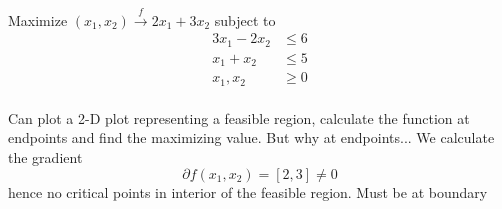 \documentclass[11pt]{article}
\begin{document}
\begin{example}
    Maximize $(x_1, x_2) \xrightarrow{f} 2x_1 + 3x_2$ subject to 
    \begin{align*}
        3x_1 - 2x_2 &\leq 6\\
        x_1 + x_2 &\leq 5\\
        x_1, x_2 &\geq 0\\
    \end{align*}
    \begin{solution}
        Can plot a 2-D plot representing a feasible region, calculate the function at endpoints and find the maximizing value. But why at endpoints... We calculate the gradient 
        \[
           \partial f(x_1, x_2) = [ 2, 3 ] \neq 0
        \]
        hence no critical points in interior of the feasible region. Must be at boundary
    \end{solution}
\end{example}
\end{document}
